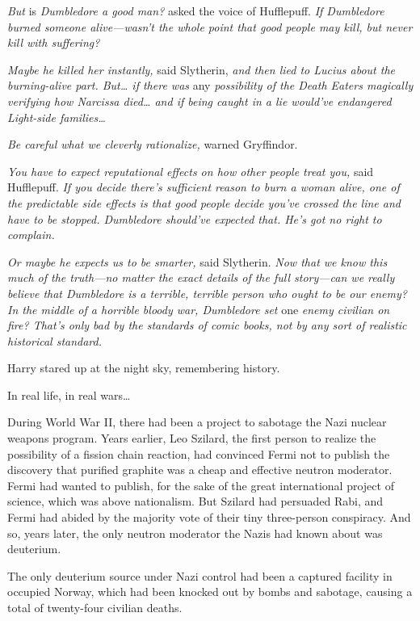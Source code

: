 \emph{But} is \emph{Dumbledore a good man?} asked the voice of Hufflepuff. 
\emph{If Dumbledore burned someone alive---wasn't the whole point that good 
people may kill, but never kill with suffering?}

\emph{Maybe he killed her instantly,} said Slytherin, \emph{and then lied to 
Lucius about the burning-alive part. But{\ldots} if there was} any 
\emph{possibility of the Death Eaters magically verifying how Narcissa 
died{\ldots} and if being caught in a lie would've endangered Light-side 
families{\ldots}}

\emph{Be careful what we cleverly rationalize,} warned Gryffindor.

\emph{You have to expect reputational effects on how other people treat you,} 
said Hufflepuff. \emph{If you decide there's sufficient reason to burn a woman 
alive, one of the predictable side effects is that good people decide you've 
crossed the line and have to be stopped. Dumbledore should've expected that. 
He's got no right to complain.}

\emph{Or maybe he expects us to be smarter,} said Slytherin. \emph{Now that we 
know this much of the truth---no matter the exact details of the full 
story---can we really believe that Dumbledore is a terrible, terrible person 
who ought to be our enemy? In the middle of a horrible bloody war, Dumbledore 
set} one \emph{enemy civilian on fire? That's only bad by the standards of 
comic books, not by any sort of realistic historical standard.}

Harry stared up at the night sky, remembering history.

In real life, in real wars{\ldots}

During World War II, there had been a project to sabotage the Nazi nuclear 
weapons program. Years earlier, Leo Szilard, the first person to realize the 
possibility of a fission chain reaction, had convinced Fermi not to publish the 
discovery that purified graphite was a cheap and effective neutron moderator. 
Fermi had wanted to publish, for the sake of the great international project of 
science, which was above nationalism. But Szilard had persuaded Rabi, and Fermi 
had abided by the majority vote of their tiny three-person conspiracy. And so, 
years later, the only neutron moderator the Nazis had known about was deuterium.

The only deuterium source under Nazi control had been a captured facility in 
occupied Norway, which had been knocked out by bombs and sabotage, causing a 
total of twenty-four civilian deaths.

